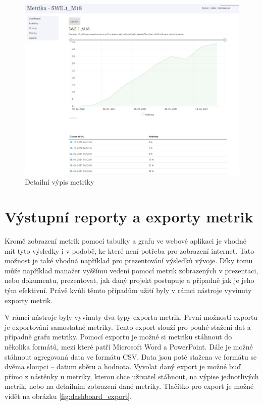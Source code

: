 \documentclass[czech,master]{diploma}
\begin{document}
\begin{figure}[!ht]
    \centering
    \includegraphics[width=1\textwidth]{Diplomka/Figures/metric_detail.png}
    \caption{Detailní výpis metriky}
    \label{fig:metric_detail}
\end{figure}


\section{Výstupní reporty a exporty metrik}
Kromě zobrazení metrik pomocí tabulky a grafu ve webové aplikaci je vhodné mít tyto výsledky i v podobě, ke které není potřeba pro zobrazení internet. Tato možnost je také vhodná například pro prezentování výsledků vývoje. Díky tomu může například manažer vyššímu vedení pomocí metrik zobrazených v prezentaci, nebo dokumentu, prezentovat, jak daný projekt postupuje a případně jak je jeho tým efektivní. Právě kvůli těmto případům užití byly v rámci nástroje vyvinuty exporty metrik.

V rámci nástroje byly vyvinuty dva typy exportu metrik. První možností exportu je exportování samostatné metriky. Tento export slouží pro pouhé stažení dat a případně grafu metriky. Pomocí exportu je možné si metriku stáhnout do několika formátů, mezi které patří Microsoft Word a PowerPoint. Dále je možné stáhnout agregovaná data ve formátu CSV. Data jsou poté stažena ve formátu se dvěma sloupci -- datum sběru a hodnota. Vyvolat daný export je možné buď přímo z nástěnky u metriky, kterou chce uživatel stáhnout, na výpise jednotlivých metrik, nebo na detailním zobrazení dané metriky. Tlačítko pro export je možné vidět na obrázku \ref{fig:dashboard_export}.
\end{document}
